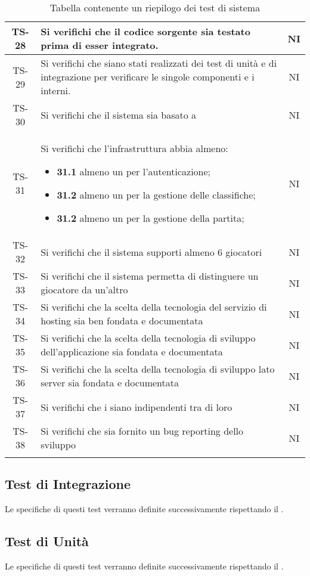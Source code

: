 \begin{center}
\begin{longtable}{|c|p{10cm}|c|}
			 \hline
			 TS-28 & Si verifichi che il codice sorgente sia testato prima di esser integrato. & NI \\
			 \hline
			 TS-29 & Si verifichi che siano stati realizzati dei test di unità e di integrazione per verificare le singole componenti e i \glock{subsystem} interni. & NI \\
			 \hline
			 TS-30 & Si verifichi che il sistema sia basato a \glock{microservizi} & NI \\
			 \hline
			 TS-31 & Si verifichi che l'infrastruttura abbia almeno: 
			 \begin{itemize}
			 	\item\textbf{31.1} almeno un \glock{microservizio} per l'autenticazione;
			 	\item\textbf{31.2} almeno un \glock{microservizio} per la gestione delle classifiche;
			 	\item\textbf{31.2} almeno un \glock{microservizio} per la gestione della partita;
			 \end{itemize}& NI \\
			 \hline
			 TS-32 & Si verifichi che il sistema supporti almeno 6 giocatori & NI \\
			 \hline
			 TS-33 & Si verifichi che il sistema permetta di distinguere un giocatore da un'altro & NI \\
			 \hline
			 TS-34 & Si verifichi che la scelta della tecnologia del servizio di hosting sia ben fondata e documentata & NI \\
			 \hline
			 TS-35 & Si verifichi che la scelta della tecnologia di sviluppo dell'applicazione sia fondata e documentata & NI \\
			 \hline
			 TS-36 & Si verifichi che la scelta della tecnologia di sviluppo lato server sia fondata e documentata & NI \\
			 \hline
			 TS-37 & Si verifichi che i \glock{microservizi} siano indipendenti tra di loro & NI \\ 
			 \hline
			 TS-38 & Si verifichi che sia fornito un bug reporting dello sviluppo & NI \\ 
			 \hline
			 \caption{Tabella contenente un riepilogo dei test di sistema}
			\end{longtable}
		\end{center}


	\subsection{Test di Integrazione}
		Le specifiche di questi test verranno definite successivamente rispettando il . 

	\subsection{Test di Unità}
	 	Le specifiche di questi test verranno definite successivamente rispettando il . 
